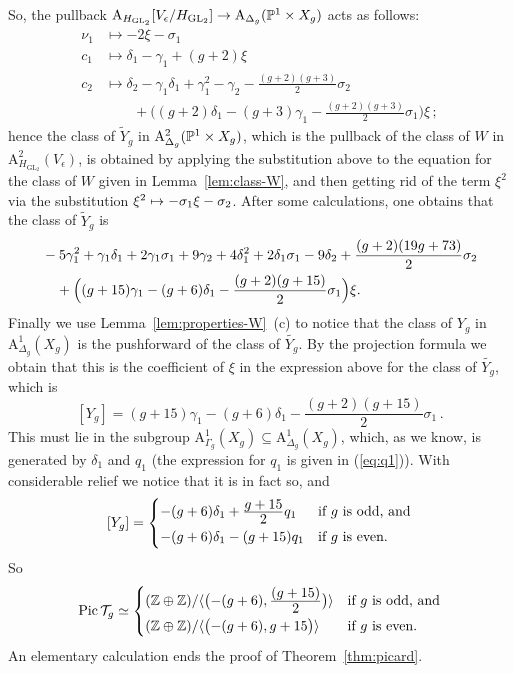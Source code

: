 \documentclass{amsart}
\numberwithin{equation}{section}
\numberwithin{subsection}{section}
\theoremstyle{definition}
\theoremstyle{remark}
\newcommand\rA{\mathrm{A}} \newcommand\rB{\mathrm{B}}
\newcommand\arr{\ifinner\to\else\longrightarrow\fi}
\newcommand\arrto{\ifinner\mapsto\else\longmapsto\fi}
\newcommand\larrto{\longmapsto}
\newcommand\pic{\operatorname{Pic}}
\newcommand\generate[1]{\langle #1 \rangle}
\newcommand{\T}[1][g]{\cT_{#1}}
\newcommand{\GL}{\mathrm{GL}}
\newcommand\Hg{H_{\GL_2}}
\newcommand\Ve{V_{\epsilon}}
\begin{document}
So, the pullback $\rA_{\Hg}[\Ve/\Hg] \arr \rA_{\Delta_{g}}(\PP^{1}\times X_{g})$ acts as follows:
   \begin{align*}
   \nu_{1} &\larrto -2\xi - \sigma_{1}\\
   c_{1}&\larrto \delta_{1} - \gamma_{1} + (g+2)\xi\\
   c_{2}&\larrto 
   \delta_{2} - \gamma_{1}\delta_{1}+ \gamma_{1}^{2} - \gamma_{2}
   -\frac{(g+2)(g+3)}{2}\sigma_{2}\\
   &\qquad + \bigl(
   (g+2)\delta_{1} - (g+3)\gamma_{1} - \frac{(g+2)(g+3)}{2}\sigma_{1}
   \bigr)\xi\,;
   \end{align*}
hence the class of $\widetilde{Y}_{g}$ in $\rA^{2}_{\Delta_{g}}(\PP^{1}\times X_{g})$, which is the pullback of the class of $W$ in $\rA^2_{\Hg}(\Ve)$, is obtained by applying the substitution above to the equation for the class of $W$ given in Lemma~\ref{lem:class-W}, and then getting rid of the term $\xi^{2}$ via the substitution $\xi^{2} \arrto -\sigma_{1}\xi - \sigma_{2}$. After some calculations, one obtains that the class of $\widetilde{Y}_{g}$ is
   \begin{align*}
   &-5\gamma_{1}^{2} + \gamma_{1}\delta_{1} + 2\gamma_{1}\sigma_{1}
      +9\gamma_{2} + 4\delta_{1}^{2} + 2\delta_{1}\sigma_{1} -9\delta_{2}
      +\frac{(g+2)(19g+73)}{2}\sigma_{2}\\
   &\quad +\Bigl(
   (g+15)\gamma_{1} - (g + 6)\delta_{1} -\frac{(g+2)(g + 15)}{2}\sigma_{1}
   \Bigr)\xi.
   \end{align*}
Finally we use Lemma~\ref{lem:properties-W}~(c) to notice that the class of $Y_{g}$ in $\rA^{1}_{\Delta_{g}}(X_{g})$ is the pushforward of the class of $\widetilde{Y_{g}}$. By the projection formula we obtain that this is the coefficient of $\xi$ in the expression above for the class of $\widetilde{Y_{g}}$, which is
   \[
   [Y_{g}] = 
   (g+15)\gamma_{1} - (g + 6)\delta_{1} -\frac{(g+2)(g + 15)}{2}\sigma_{1}\,.
   \]
This must lie in the subgroup $\rA^{1}_{\Gamma_{g}}(X_{g}) \subseteq  \rA^{1}_{\Delta_{g}}(X_{g})$, which, as we know, is generated by $\delta_{1}$ and $q_{1}$ (the expression for $q_{1}$ is given in (\ref{eq:q1})). With considerable relief we notice that it is in fact so, and
   \[
   [Y_{g}] = 
   \begin{cases}
   -(g + 6)\delta_{1}
      + \frac{\displaystyle g+15}{\displaystyle\mathstrut 2}q_{1}
   & \text{if $g$ is odd, and}\\
   -(g + 6)\delta_{1} - (g + 15)q_{1}
   &\text{if $g$ is even.}
   \end{cases}
   \]
So
   \[
   \pic\T \simeq
   \begin{cases}
   (\ZZ\oplus\ZZ)/\generate{\bigl(-(g + 6), 
      \frac{\displaystyle (g + 15)}{\displaystyle\mathstrut 2}\bigr)}
   & \text{if $g$ is odd, and}\\
   (\ZZ\oplus\ZZ)/\generate{\bigl(-(g + 6), g + 15\bigr)}
   &\text{if $g$ is even.}
   \end{cases}
   \]
An elementary calculation ends the proof of Theorem~\ref{thm:picard}.






%

\end{document}
